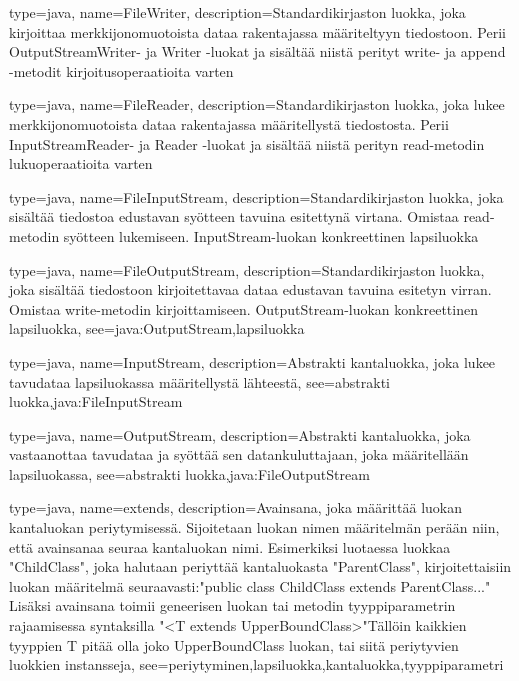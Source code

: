 {
	type=java,
	name=FileWriter,
	description={Standardikirjaston luokka, joka kirjoittaa merkkijonomuotoista dataa rakentajassa
määriteltyyn tiedostoon. Perii OutputStreamWriter- ja Writer -luokat ja sisältää niistä perityt
write- ja append -metodit kirjoitusoperaatioita varten}
}

{
	type=java,
	name=FileReader,
	description={Standardikirjaston luokka, joka lukee merkkijonomuotoista dataa rakentajassa
määritellystä tiedostosta. Perii InputStreamReader- ja Reader -luokat ja sisältää niistä perityn
read-metodin lukuoperaatioita varten}
}

{
	type=java,
	name=FileInputStream,
	description={Standardikirjaston luokka, joka sisältää tiedostoa edustavan syötteen tavuina
esitettynä virtana. Omistaa read-metodin syötteen lukemiseen. InputStream-luokan konkreettinen
lapsiluokka}
}

{
	type=java,
	name=FileOutputStream,
	description={Standardikirjaston luokka, joka sisältää tiedostoon kirjoitettavaa dataa
edustavan tavuina esitetyn virran. Omistaa write-metodin kirjoittamiseen. OutputStream-luokan
konkreettinen lapsiluokka},
	see={java:OutputStream,lapsiluokka}
}

{
	type=java,
	name=InputStream,
	description={Abstrakti kantaluokka, joka lukee tavudataa lapsiluokassa määritellystä
lähteestä},
	see={abstrakti luokka,java:FileInputStream}
}

{
	type=java,
	name=OutputStream,
	description={Abstrakti kantaluokka, joka vastaanottaa tavudataa ja syöttää sen	
datankuluttajaan, joka määritellään lapsiluokassa},
	see={abstrakti luokka,java:FileOutputStream}
}

{
	type=java,
	name=extends,
	description={Avainsana, joka määrittää luokan kantaluokan periytymisessä. Sijoitetaan luokan
nimen määritelmän perään niin, että avainsanaa seuraa kantaluokan nimi. Esimerkiksi luotaessa
luokkaa "ChildClass", joka halutaan periyttää kantaluokasta "ParentClass", kirjoitettaisiin luokan
määritelmä seuraavasti:\newline{}"public class ChildClass extends ParentClass..."\newline{}
Lisäksi avainsana toimii geneerisen luokan tai metodin tyyppiparametrin rajaamisessa syntaksilla
\newline{}"<T extends UpperBoundClass>"\newline{}Tällöin kaikkien tyyppien T pitää olla joko
UpperBoundClass luokan, tai siitä periytyvien luokkien instansseja},
	see={periytyminen,lapsiluokka,kantaluokka,tyyppiparametri}
}

